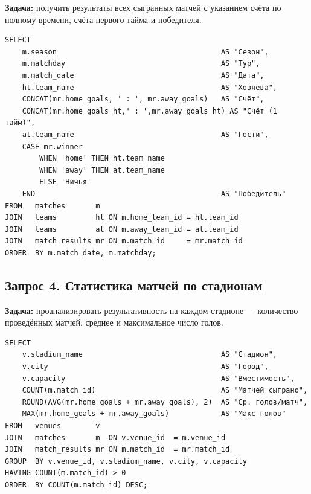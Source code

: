 \documentclass[14pt,a4paper]{extarticle}
\begin{document}
\textbf{Задача:} получить результаты всех сыгранных матчей с указанием счёта
по полному времени, счёта первого тайма и победителя.

\begin{listing}[H]
\caption{Результаты матчей с полным счётом и счётом первого тайма}
\begin{verbatim}
SELECT
    m.season                                      AS "Сезон",
    m.matchday                                    AS "Тур",
    m.match_date                                  AS "Дата",
    ht.team_name                                  AS "Хозяева",
    CONCAT(mr.home_goals, ' : ', mr.away_goals)   AS "Счёт",
    CONCAT(mr.home_goals_ht,' : ',mr.away_goals_ht) AS "Счёт (1 тайм)",
    at.team_name                                  AS "Гости",
    CASE mr.winner
        WHEN 'home' THEN ht.team_name
        WHEN 'away' THEN at.team_name
        ELSE 'Ничья'
    END                                           AS "Победитель"
FROM   matches       m
JOIN   teams         ht ON m.home_team_id = ht.team_id
JOIN   teams         at ON m.away_team_id = at.team_id
JOIN   match_results mr ON m.match_id     = mr.match_id
ORDER  BY m.match_date, m.matchday;
\end{verbatim}
\end{listing}

\subsection{Запрос 4. Статистика матчей по стадионам}

\textbf{Задача:} проанализировать результативность на каждом стадионе —
количество проведённых матчей, среднее и максимальное число голов.

\begin{listing}[H]
\caption{Статистика матчей по стадионам}
\begin{verbatim}
SELECT
    v.stadium_name                                AS "Стадион",
    v.city                                        AS "Город",
    v.capacity                                    AS "Вместимость",
    COUNT(m.match_id)                             AS "Матчей сыграно",
    ROUND(AVG(mr.home_goals + mr.away_goals), 2)  AS "Ср. голов/матч",
    MAX(mr.home_goals + mr.away_goals)            AS "Макс голов"
FROM   venues        v
JOIN   matches       m  ON v.venue_id  = m.venue_id
JOIN   match_results mr ON m.match_id  = mr.match_id
GROUP  BY v.venue_id, v.stadium_name, v.city, v.capacity
HAVING COUNT(m.match_id) > 0
ORDER  BY COUNT(m.match_id) DESC;
\end{verbatim}
\end{listing}
\end{document}
